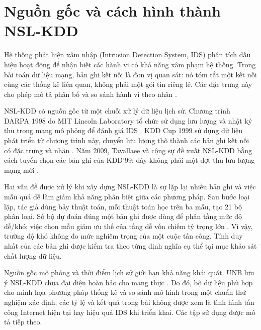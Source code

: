 \section{Nguồn gốc và cách hình thành NSL-KDD}
Hệ thống phát hiện xâm nhập (Intrusion Detection System, IDS) phân tích dấu hiệu hoạt động để nhận biết các hành vi có khả năng xâm phạm hệ thống. Trong bài toán dữ liệu mạng, bản ghi kết nối là đơn vị quan sát: nó tóm tắt một kết nối cùng các thống kê liên quan, không phải một gói tin riêng lẻ. Các đặc trưng này cho phép mô tả phân bố và so sánh hành vi theo nhãn \cite{task2_kdd1999}.

NSL-KDD có nguồn gốc từ một chuỗi xử lý dữ liệu lịch sử. Chương trình DARPA 1998 do MIT Lincoln Laboratory tổ chức sử dụng lưu lượng và nhật ký thu trong mạng mô phỏng để đánh giá IDS \cite{chuong2_mit1998}. KDD Cup 1999 sử dụng dữ liệu phát triển từ chương trình này, chuyển lưu lượng thô thành các bản ghi kết nối có đặc trưng và nhãn \cite{task2_kdd1999}. Năm 2009, Tavallaee và cộng sự đề xuất NSL-KDD bằng cách tuyển chọn các bản ghi của KDD'99; đây không phải một đợt thu lưu lượng mạng mới \cite{task1_tavallaee2009}.

Hai vấn đề được xử lý khi xây dựng NSL-KDD là sự lặp lại nhiều bản ghi và việc mẫu quá dễ làm giảm khả năng phân biệt giữa các phương pháp. Sau bước loại lặp, tác giả dùng bảy thuật toán, mỗi thuật toán học trên ba mẫu, tạo 21 bộ phân loại. Số bộ dự đoán đúng một bản ghi được dùng để phân tầng mức độ dễ/khó; việc chọn mẫu giảm ưu thế của tầng dễ vốn chiếm tỷ trọng lớn \cite{task1_tavallaee2009}. Vì vậy, trường độ khó không đo mức nghiêm trọng của một cuộc tấn công. Tính duy nhất của các bản ghi được kiểm tra theo từng định nghĩa cụ thể tại mục khảo sát chất lượng dữ liệu.

Nguồn gốc mô phỏng và thời điểm lịch sử giới hạn khả năng khái quát. UNB lưu ý NSL-KDD chưa đại diện hoàn hảo cho mạng thực \cite{task2_unb2009}. Do đó, bộ dữ liệu phù hợp cho minh họa phương pháp thống kê và so sánh mô hình trong một chuẩn thử nghiệm xác định; các tỷ lệ và kết quả trong bài không được xem là tình hình tấn công Internet hiện tại hay hiệu quả IDS khi triển khai. Các tập sử dụng được mô tả tiếp theo.

